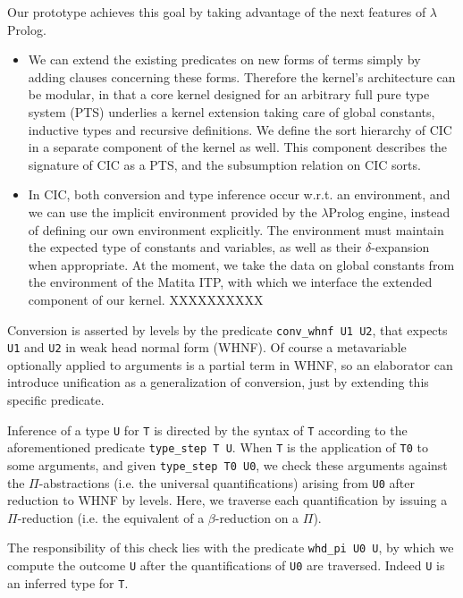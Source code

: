 Our prototype achieves this goal by taking advantage of the next features of $\lambda$Prolog.

\begin{itemize}

\item
We can extend the existing predicates on new forms of terms
simply by adding clauses concerning these forms. 
Therefore the kernel's architecture can be modular,
in that a core kernel designed for an arbitrary full pure type system (PTS)
underlies a kernel extension taking care of global constants,
inductive types and recursive definitions.
We define the sort hierarchy of CIC in a separate component of the kernel as well.
This component describes the signature of CIC as a PTS,
and the subsumption relation on CIC sorts.

\item
In CIC, both conversion and type inference occur w.r.t. an environment,
and we can use the implicit environment provided by the
$\lambda$Prolog engine, instead of defining our own environment explicitly.
The environment must maintain the expected type of constants and variables,
as well as their $\delta$-expansion when appropriate.
At the moment, we take the data on global constants from the
environment of the Matita ITP, with which we interface the extended
component of our kernel. XXXXXXXXXX

\end{itemize}

Conversion is asserted by levels by the predicate \verb+conv_whnf U1 U2+,
that expects \verb+U1+ and \verb+U2+ in weak head normal form (WHNF).
Of course a metavariable optionally applied to arguments is a partial
term in WHNF, so an elaborator can introduce unification as a
generalization of conversion, just by extending this specific predicate.

Inference of a type \verb+U+ for \verb+T+ is directed by the syntax of \verb+T+
according to the aforementioned predicate \verb+type_step T U+.
When \verb+T+ is the application of \verb+T0+ to some arguments,
and given \verb+type_step T0 U0+,
we check these arguments against the $\Pi$-abstractions (i.e. the
universal quantifications) arising from \verb+U0+ after reduction to
WHNF by levels. Here, we traverse each quantification by issuing a $\Pi$-reduction
(i.e. the equivalent of a $\beta$-reduction on a $\Pi$).

The responsibility of this check lies with the predicate \verb+whd_pi U0 U+,
by which we compute the outcome \verb+U+ after the quantifications of
\verb+U0+ are traversed. Indeed \verb+U+ is an inferred type for \verb+T+.

